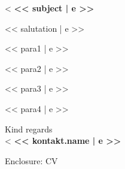 \documentclass[11pt,a4paper]{article}
\begin{document}
<%
\vspace*{70.5mm}
{\bfseries\color{accent}<< subject | e >>}

\vspace{\baselineskip}
<< salutation | e >>

<< para1 | e >>

<< para2 | e >>

<< para3 | e >>

<< para4 | e >>

\begin{minipage}{\textwidth}
\vspace{2pt}
Kind regards\\[1mm]
<%
{\bfseries\color{accent}<< kontakt.name | e >>}
\end{minipage}

\vspace{0.5\baselineskip}
{\small Enclosure: CV}
\end{document}
